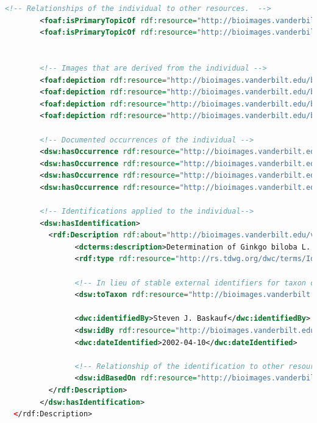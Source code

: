 \begin{appendices}
\begin{lstlisting}[language=XML, caption={Darwin-SW Representation of a Living Specimen}]
        <!-- Relationships of the individual to other resources.  -->
        <foaf:isPrimaryTopicOf rdf:resource="http://bioimages.vanderbilt.edu/vanderbilt/12-126.rdf" />
        <foaf:isPrimaryTopicOf rdf:resource="http://bioimages.vanderbilt.edu/vanderbilt/12-126.htm" />

        
        <!-- Images that are derived from the individual -->
        <foaf:depiction rdf:resource="http://bioimages.vanderbilt.edu/baskauf/10502"/>
        <foaf:depiction rdf:resource="http://bioimages.vanderbilt.edu/baskauf/10557"/>
        <foaf:depiction rdf:resource="http://bioimages.vanderbilt.edu/baskauf/10556"/>
        <foaf:depiction rdf:resource="http://bioimages.vanderbilt.edu/baskauf/10554"/>

        <!-- Documented occurrences of the individual -->
        <dsw:hasOccurrence rdf:resource="http://bioimages.vanderbilt.edu/baskauf/10502#occ" />
        <dsw:hasOccurrence rdf:resource="http://bioimages.vanderbilt.edu/baskauf/10557#occ" />
        <dsw:hasOccurrence rdf:resource="http://bioimages.vanderbilt.edu/baskauf/10556#occ" />
        <dsw:hasOccurrence rdf:resource="http://bioimages.vanderbilt.edu/baskauf/10554#occ" />

        <!-- Identifications applied to the individual-->
        <dsw:hasIdentification>
          <rdf:Description rdf:about="http://bioimages.vanderbilt.edu/vanderbilt/12-126#2002-04-10baskauf">
                <dcterms:description>Determination of Ginkgo biloba L. sensu Flora of North America (1993) for the individual http://bioimages.vanderbilt.edu/vanderbilt/12-126</dcterms:description>
                <rdf:type rdf:resource="http://rs.tdwg.org/dwc/terms/Identification" />

                <!-- In lieu of stable external identifiers for taxon concepts, Im defining some onsite -->
				<dsw:toTaxon rdf:resource="http://bioimages.vanderbilt.edu/taxonConcepts#183269-fna1993" />

				<dwc:identifiedBy>Steven J. Baskauf</dwc:identifiedBy>
                <dsw:idBy rdf:resource="http://bioimages.vanderbilt.edu/contact/baskauf" />
				<dwc:dateIdentified>2002-04-10</dwc:dateIdentified>

				<!-- Relationship of the identification to other resources -->
				<dsw:idBasedOn rdf:resource="http://bioimages.vanderbilt.edu/baskauf/10554"/>
          </rdf:Description>
        </dsw:hasIdentification>
  </rdf:Description>


\end{lstlisting}
\end{appendices}
